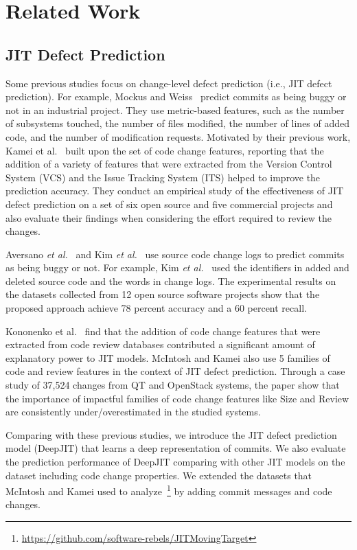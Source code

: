 \section{Related Work}
\label{sec:related}
\subsection{JIT Defect Prediction}
Some previous studies focus on change-level defect prediction (i.e., JIT defect prediction). For example, Mockus and Weiss~\cite{Mockus2000} predict commits as being buggy or not in an industrial project. They use metric-based features, such as the number of subsystems touched, the number of files modified, the number of lines of added code, and the number of modification requests. Motivated by their previous work, Kamei et al.~\cite{Kamei:2013:LES} built upon the set of code change features, reporting that the addition of a variety of features that were extracted from the Version Control System (VCS) and the Issue Tracking System (ITS) helped to improve the prediction accuracy. They conduct an empirical study of the effectiveness of JIT defect prediction on a set of six open source and five commercial projects and also evaluate their findings when considering the effort required to review the changes.

Aversano \emph{et al.}~\cite{Aversano2007} and Kim \emph{et al.}~\cite{Kim2008} use source code change logs to predict commits as being buggy or not. For example, Kim \emph{et al.}~\cite{Kim2008} used the identifiers in added and deleted source code and the words in change logs. The experimental results on the datasets collected from 12 open source software projects show that the proposed approach achieve 78 percent accuracy and a 60 percent recall.

Kononenko et al.~\cite{Kononenko:2015} find that the addition of code change features that were extracted from code review databases contributed a significant amount of explanatory power to JIT models. McIntosh and Kamei also use 5 families of code and review features in the context of JIT defect prediction. Through a case study of 37,524 changes from QT and OpenStack systems, the paper show that the importance of impactful families of code change features like Size and Review are consistently under/overestimated in the studied systems.

Comparing with these previous studies, we introduce the JIT defect prediction model (DeepJIT) that learns a deep representation of commits. We also evaluate the prediction performance of DeepJIT comparing with other JIT models on the dataset including code change properties. We extended the datasets that McIntosh and Kamei used to analyze~\footnote{\url{https://github.com/software-rebels/JITMovingTarget}} by adding commit messages and code changes. 

